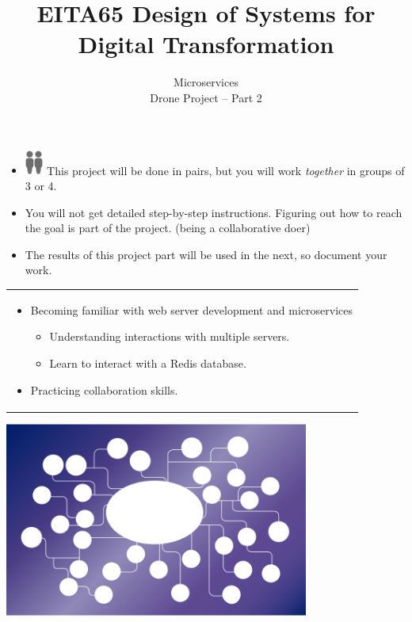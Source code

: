 \documentclass{article}
\title{EITA65 Design of Systems for Digital Transformation\\\year}
\author{\huge Microservices\\Drone Project -- Part 2}
\begin{document}
\clearpage\maketitle
\thispagestyle{empty}%

\begin{itemize}
\item \includegraphics[width=3mm]{person.png}\includegraphics[width=3mm]{person.png} This project will be done in pairs, but you will work \textit{together} in groups of 3 or 4.
\item You will not get detailed step-by-step instructions. Figuring out how to reach the goal is part of the project. (being a collaborative doer)
\item The results of this project part will be used in the next, so document your work.
\end{itemize}

\vspace{.1cm}
\begin{center}
\begin{tabular}{l}
\toprule[1.5pt]
\parbox{0.8\linewidth}{
\vspace{.2cm}{\Large Learning goals:}
\begin{itemize}
\item Becoming familiar with web server development and microservices
  \begin{itemize}
  \item Understanding interactions with multiple servers.
  \item Learn to interact with a Redis database. 
  \end{itemize}
\item Practicing collaboration skills.
\end{itemize}}\\
\bottomrule[1.5pt]
\end{tabular}
\end{center}
\vfill
\begin{center}
\includegraphics[width=100mm]{networkclipart.png}
\end{center}
\vspace{2cm}
\end{document}
